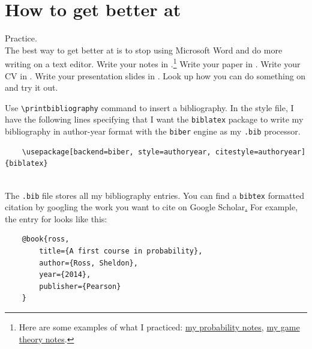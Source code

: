 \documentclass[12pt, notitlepage]{article}
\begin{document}
\section{How to get better at \latex}

{\LARGE Practice.}\\

The best way to get better at \latex is to stop using Microsoft Word and do more writing on a \latex text editor. Write your notes in \latex.\footnote{Here are some examples of what I practiced: \href{https://drive.google.com/file/d/0B1KGXZttjtvpZ21OeTE2RW4xLUU/view?usp=sharing}{my probability notes},  \href{https://drive.google.com/drive/folders/0B1KGXZttjtvpd2xHaU9WcFN2OFk}{my game theory notes}.} Write your paper in \latex. Write your CV in \latex. Write your presentation slides in \latex. Look up how you can do something on \latex and try it out. 


\newpage




\begin{notes}
Use \verb|\printbibliography| command to insert a bibliography. In the style file, I have the following lines specifying that I want the \texttt{biblatex} package to write my bibliography in author-year format with the  \texttt{biber} engine as my \texttt{.bib} processor.
	\begin{verbatim}
	\usepackage[backend=biber, style=authoryear, citestyle=authoryear]{biblatex}
	
	\end{verbatim}
The \texttt{.bib} file stores all my bibliography entries. You can find a \texttt{bibtex} formatted citation by googling the work you want to cite on {Google Scholar}\href{https://scholar.google.com/}. For example, the entry for \cite{ross} looks like this:
	\begin{verbatim}
	@book{ross,
  		title={A first course in probability},
  		author={Ross, Sheldon},
  		year={2014},
  		publisher={Pearson}
	}
	\end{verbatim}
\end{notes}

\printbibliography
\end{document}
